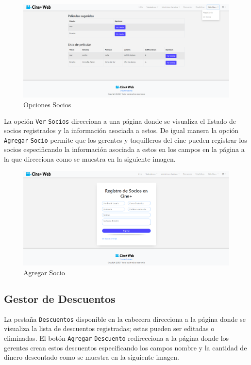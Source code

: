 \begin{figure}[h!]
	\centering
	\includegraphics[scale=0.35]{./chapters/img/option_partner.png}
	
	\label{fig:option_partner}
	\caption{Opciones Socios}
	
\end{figure}

La opci\'on \verb*|Ver| \verb*|Socios| direcciona a una p\'agina donde se visualiza el listado de socios registrados y la informaci\'on asociada a estos. De igual manera la opci\'on \verb*|Agregar| \verb*|Socio| permite que los gerentes y taquilleros del cine pueden registrar los socios especificando la informaci\'on asociada a estos en los campos en la p\'agina a la que direcciona como se muestra en la siguiente imagen.

\begin{figure}[h!]
	\centering
	\includegraphics[scale=0.35]{./chapters/img/add_partner.png}
	
	\label{fig:add_partner}
	\caption{Agregar Socio}
	
\end{figure}

\subsection{Gestor de Descuentos}
La pesta\~na \verb*|Descuentos| disponible en la cabecera direcciona a la p\'agina donde se visualiza la lista de descuentos registradas; estas pueden ser editadas o eliminadas. El bot\'on \verb*|Agregar| \verb*|Descuento| redirecciona a la p\'agina donde los gerentes crean estos descuentos especificando los campos nombre y la cantidad de dinero descontado como se muestra en la siguiente imagen.

